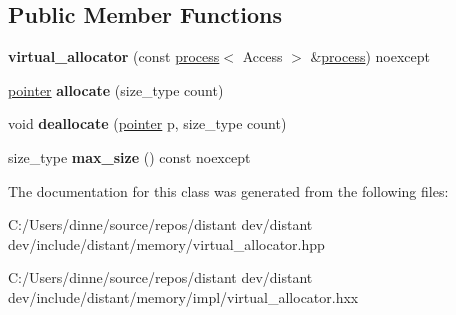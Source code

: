 \subsection*{Public Member Functions}
\begin{DoxyCompactItemize}
\item 
\mbox{\label{classdistant_1_1memory_1_1virtual__allocator_a98f83a116256ebe497b788aa23b3a56b}} 
{\bfseries virtual\+\_\+allocator} (const \mbox{\hyperlink{classdistant_1_1kernel__objects_1_1process}{process}}$<$ Access $>$ \&\mbox{\hyperlink{classdistant_1_1kernel__objects_1_1process}{process}}) noexcept
\item 
\mbox{\label{classdistant_1_1memory_1_1virtual__allocator_a9c9b28fbe61d4ec8d231527f2f2f1a25}} 
\mbox{\hyperlink{classdistant_1_1memory_1_1virtual__ptr}{pointer}} {\bfseries allocate} (size\+\_\+type count)
\item 
\mbox{\label{classdistant_1_1memory_1_1virtual__allocator_ae04dc300d479920055cbce11b4a20256}} 
void {\bfseries deallocate} (\mbox{\hyperlink{classdistant_1_1memory_1_1virtual__ptr}{pointer}} p, size\+\_\+type count)
\item 
\mbox{\label{classdistant_1_1memory_1_1virtual__allocator_a6d68950bcc34434a6ff1fd6908471786}} 
size\+\_\+type {\bfseries max\+\_\+size} () const noexcept
\end{DoxyCompactItemize}


The documentation for this class was generated from the following files\+:\begin{DoxyCompactItemize}
\item 
C\+:/\+Users/dinne/source/repos/distant dev/distant dev/include/distant/memory/virtual\+\_\+allocator.\+hpp\item 
C\+:/\+Users/dinne/source/repos/distant dev/distant dev/include/distant/memory/impl/virtual\+\_\+allocator.\+hxx\end{DoxyCompactItemize}
